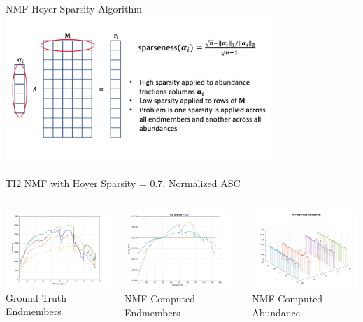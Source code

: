 \documentclass{beamer}
\begin{document}
\begin{frame}{NMF Hoyer Sparsity Algorithm}
    \includegraphics[width=10cm,center]{NMF}
\end{frame}

\begin{frame}{TI2 NMF with Hoyer Sparsity = 0.7, Normalized ASC}
\begin{columns}
    \begin{column}{0.33\textwidth}
        \includegraphics[width=4cm,center]{reflectance}
        \\ Ground Truth Endmembers
        \centering
    \end{column}
    \begin{column}{0.33\textwidth}
        \includegraphics[width=4cm,center]{nmf_endmembers_ti2_70.png}
        \\ NMF Computed Endmembers
        \centering
    \end{column}
    \begin{column}{0.33\textwidth}
        \includegraphics[width=4cm,center]{nmf_abundance_ti2_70_allmaterials.png}
        \\ NMF Computed Abundance
        \centering
    \end{column}
\end{columns}
\end{frame}
\end{document}
